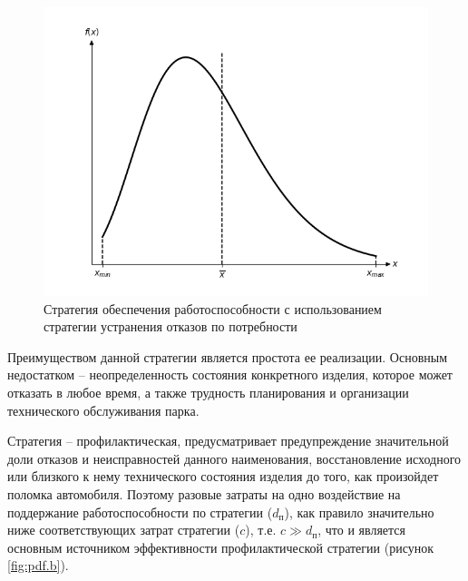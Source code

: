 \documentclass[../nirs.tex]{subfiles}
\begin{document}
\begin{figure}[H]
\centering
\includegraphics[keepaspectratio,width=\textwidth]{./images/pdf.a.png}
\caption{Стратегия обеспечения работоспособности с использованием стратегии
устранения отказов по потребности}
\label{fig:pdf.a}
\end{figure}

Преимуществом данной стратегии является простота ее реализации. Основным
недостатком -- неопределенность состояния конкретного изделия, которое может
отказать в любое время, а также трудность планирования и организации
технического обслуживания парка.

Стратегия  -- профилактическая, предусматривает предупреждение
значительной доли отказов и неисправностей данного наименования, восстановление
исходного или близкого к нему технического состояния изделия до того, как
произойдет поломка автомобиля. Поэтому разовые затраты на одно воздействие на
поддержание работоспособности по стратегии  ($d_{\text{п}}$), как
правило значительно ниже соответствующих затрат стратегии  ($c$), т.е.
$c \gg d_{\text{п}}$, что и является основным источником эффективности
профилактической стратегии (рисунок \ref{fig:pdf.b}).
\end{document}
